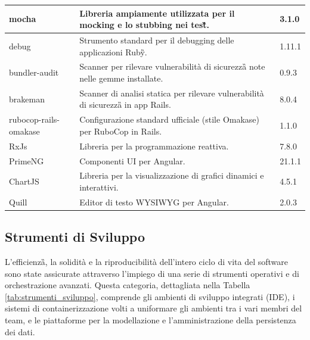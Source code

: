 \documentclass[a4paper,11pt]{article}
\begin{document}
\begin{longtable}{|p{3.5cm}|p{8.5cm}|p{3cm}|}
\hline
mocha & Libreria ampiamente utilizzata per il mocking e lo stubbing nei test\G{}. & 3.1.0 \\
\hline
debug & Strumento standard per il debugging delle applicazioni Ruby\G{}. & 1.11.1 \\
\hline
bundler-audit & Scanner per rilevare vulnerabilità di sicurezza\G{} note nelle gemme installate. & 0.9.3 \\
\hline
brakeman & Scanner di analisi statica per rilevare vulnerabilità di sicurezza\G{} in app Rails. & 8.0.4 \\
\hline
rubocop-rails-omakase & Configurazione standard ufficiale (stile Omakase) per RuboCop in Rails. & 1.1.0 \\
\hline
RxJs & Libreria per la programmazione reattiva.& 7.8.0 \\
\hline
PrimeNG & Componenti UI per Angular.& 21.1.1 \\
\hline
ChartJS & Libreria per la visualizzazione di grafici dinamici e interattivi. & 4.5.1 \\
\hline
Quill & Editor di testo WYSIWYG per Angular. & 2.0.3 \\
\end{longtable}


\subsection{Strumenti di Sviluppo}
L'efficienza\G{}, la solidità e la riproducibilità dell'intero ciclo di vita del software sono state assicurate attraverso l'impiego di una serie di strumenti operativi e di orchestrazione avanzati. Questa categoria, dettagliata nella Tabella \ref{tab:strumenti_sviluppo}, comprende gli ambienti di sviluppo integrati (IDE), i sistemi di containerizzazione volti a uniformare gli ambienti tra i vari membri del team, e le piattaforme per la modellazione e l'amministrazione della persistenza dei dati.
\end{document}
